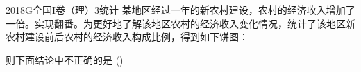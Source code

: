 
\begin{problem}{2018}{G}{全国I卷（理）}{3}{统计}
某地区经过一年的新农村建设，农村的经济收入增加了一倍。实现翻番。为更好地了解该地区农村的经济收入变化情况，统计了该地区新农村建设前后农村的经济收入构成比例，得到如下饼图：



则下面结论中不正确的是 (\hspace{1cm})
\begin{choices}
\end{choices}
\end{problem}

\begin{answer}

\end{answer}

\begin{solutions}

\end{solutions}